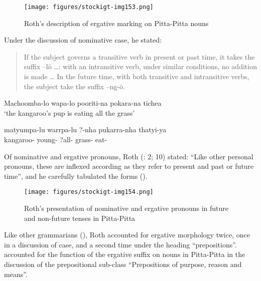 \begin{figure}
\texttt{[image: figures/stockigt-img153.png]}
\caption{Roth's description of ergative marking on Pitta-Pitta nouns \citeyearpar[7]{roth_ethnological_1897}}
\label{bkm:Ref465081043}
\label{fig:key:10-153}
\label{fig:key:209}
\end{figure}

Under the discussion of nominative case, he stated:

\begin{quote}
If the subject governs a transitive verb in present or past time, it takes the suffix –lō …: with an intransitive verb, under similar conditions, no addition is made … In the future time, with both transitive and intransitive verbs, the subject take the suffix –ng-ō. \citep[7]{roth_ethnological_1897}
\end{quote}

\ea
Machoomba-lo   wapa-lo          pooriti-na          pokara-na      tichea\\
\glt `the kangaroo’s pup is eating all the grass'

                  \citep[12]{roth_ethnological_1897}

\gll matyumpa-lu       warrpa-lu       ?-nha       pukarra-nha   thatyi-ya\\
kangaroo-    young-     ?all-        grass-      eat-\\
\z

Of nominative and ergative pronouns, Roth (\citeyear{roth_ethnological_1897}: 2; 10) stated: “Like other personal pronouns, these are inflexed according as they refer to present and past or future time”, and he carefully tabulated the forms ().


\begin{figure}
\texttt{[image: figures/stockigt-img154.png]}
\caption{Roth's presentation of nominative and ergative pronouns in future and non-future tenses in Pitta-Pitta \citeyearpar[10]{roth_ethnological_1897}}
\label{bkm:Ref465081051}
\label{fig:key:8-210}
\end{figure}

\hspace*{-4.4pt}Like other grammarians (), Roth accounted for ergative morphology twice, once in a discussion of case, and a second time under the heading ``prepositions''. \citet[16]{roth_ethnological_1897} accounted for the function of the ergative suffix on nouns in Pitta-Pitta\textbf{ }in the discussion of the prepositional sub-class “Prepositions of purpose, reason and means''.

